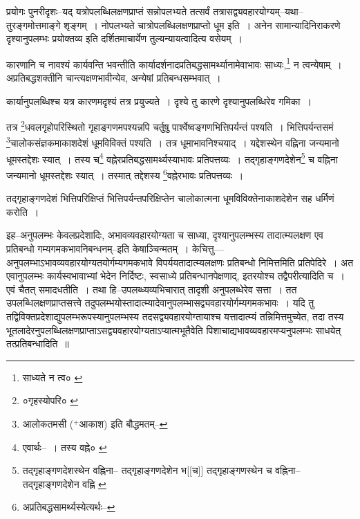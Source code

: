\documentclass[article,12pt,a4paper]{memoir}
\newcommand{\add}[1]{($^{+}$#1)}
\begin{document}
	  \pstart प्रयोगः पुनरीदृशः--यद् यत्रोपलब्धिलक्षणप्राप्तं सन्नोपलभ्यते तत्सर्वं तत्रासद्व्यवहारयोग्यम्--यथा--तुरङ्गमोत्तमाङ्गे शृङ्गम् । नोपलभ्यते चात्रोपलब्धिलक्षणप्राप्तो धूम इति । अनेन सामान्यादिनिराकरणे दृश्यानुपलम्भः प्रयोक्तव्य इति दर्शितमाचार्येण तुल्यन्यायत्वादित्य वसेयम् ।
	\pend
      \leavevmode{}
	  \bigskip
	  \begingroup
	

	  \pstart कारणानि च नावश्यं कार्यवन्ति भवन्तीति कार्यादर्शनादप्रतिबद्धसामर्थ्यानामेवाभावः साध्यः,\footnote{साध्यते न त्व० \cite{dp-msC}} न त्वन्येषाम् । अप्रतिबद्धशक्तीनि चान्त्यक्षणभावीन्येव, अन्येषां प्रतिबन्धसम्भवात् ।
	\pend
       

	  \pstart कार्यानुपलब्धिश्च यत्र कारणमदृश्यं तत्र प्रयुज्यते । दृश्ये तु कारणे दृश्यानुपलब्धिरेव गमिका ।
	\pend
       

	  \pstart तत्र \footnote{०गृहस्योपरि० \cite{dp-msB} \cite{dp-msC} \cite{dp-msD}}धवलगृहोपरिस्थितो गृहाङ्गणमपश्यन्नपि चर्तुषु पार्श्वेष्वङ्गणभित्तिपर्यन्तं पश्यति । भित्तिपर्यन्तसमं \footnote{आलोकतमसी \add{आकाश} इति बौद्धमतम्--\cite{dp-msD-n}}चालोकसंज्ञकमाकाशदेशं धूमविविक्तं पश्यति । तत्र धूमाभावनिश्चयाद् । यद्देशस्थेन वह्निना जन्यमानो धूमस्तद्देशः स्यात् । तस्य च\footnote{एवार्थः--\cite{dp-msD-n} । तस्य वह्ने० \cite{dp-msB}} वह्नेरप्रतिबद्धसामर्थ्यस्याभावः प्रतिपत्तव्यः । तद्गृहाङ्गणदेशेन\footnote{तद्गृहाङ्गणदेशस्थेन वह्निना--\cite{dp-msC} \cite{dp-msD} तद्गृहाङ्गणदेशेन भ[[च]] \cite{dp-msA} तद्गृहाङ्गणस्थेन च वह्निना--\cite{dp-msB} तद्गृहाङ्गणदेशेन वह्नि \cite{dp-edP} \cite{dp-edH} \cite{dp-edE}} च वह्निना जन्यमानो धूमस्तद्देशः स्यात् । तस्मात् तद्देशस्य \footnote{अप्रतिबद्धसामर्थ्यस्येत्यर्थः--\cite{dp-msD-n}}वह्नेरभावः प्रतिपत्तव्यः ।
	\pend
       

	  \pstart तद्गृहाङ्गणदेशं भित्तिपरिक्षिप्तं भित्तिपर्यन्तपरिक्षिप्तेन चालोकात्मना धूमविविक्तेनाकाशदेशेन सह धर्मिणं करोति ।
	\pend
      
	  \endgroup
	

	  \pstart इह--अनुपलम्भः केवलप्रदेशादिः, अभावव्यवहारयोग्यता च साध्या, दृश्यानुपलम्भस्य तादात्म्यलक्षण एव प्रतिबन्धो गम्यगमकभावनिबन्धनम्--इति केषाञ्चिन्मतम् । केचित्तु—अनुपलम्भाऽभावव्यवहारयोग्यतयोर्गम्यगमकभावे विपर्ययतादात्म्यलक्षणः प्रतिबन्धो निमित्तमिति प्रतिपेदिरे । अत एवानुपलम्भः कार्यस्वभावाभ्यां भेदेन निर्दिष्टः, स्वसाध्ये प्रतिबन्धानपेक्षणाद्, इतरयोश्च तद्वैपरीत्यादिति च । एवं चैतत् समादधतीति । तथा हि--उपलब्ध्यव्यभिचारात् तादृशी अनुपलब्धेरेव सत्ता । तत उपलब्धिलक्षणप्राप्तसत्त्वे तदुपलम्भयोस्तादात्म्यादेवानुपलम्भासद्व्यवहारयोर्गम्यगमकभावः । यदि तु तद्विविक्तप्रदेशाद्युपलम्भरूपस्यानुपलम्भस्य तदसद्व्यवहारयोग्तायाश्च यत्तादात्म्यं तन्निमित्तमुच्येत, तदा तस्य भूतलादेरनुपलब्धिलक्षणप्राप्ताऽसद्व्यवहारयोग्यताऽप्यात्मभूतैवेति पिशाचाद्यभावव्यवहारमप्यनुपलम्भः साधयेत् तत्प्रतिबन्धादिति ॥
	\pend
      
\end{document}
